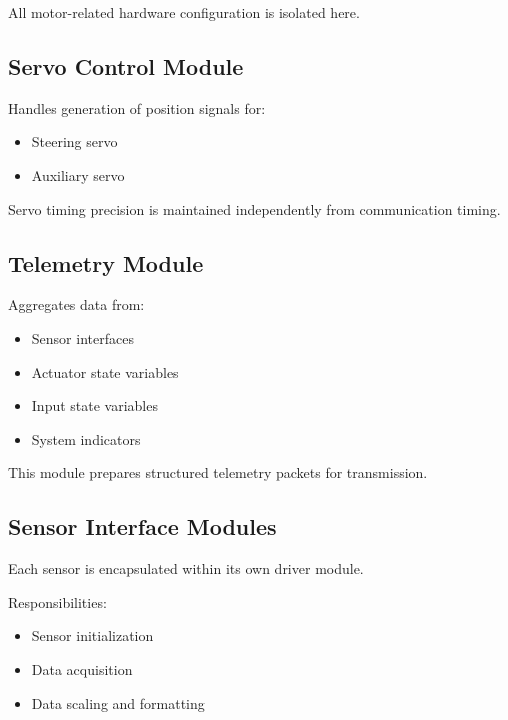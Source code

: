 All motor-related hardware configuration is isolated here.


\subsection{Servo Control Module}

Handles generation of position signals for:

\begin{itemize}
	\item Steering servo
	\item Auxiliary servo
\end{itemize}

Servo timing precision is maintained independently from communication timing.


\subsection{Telemetry Module}

Aggregates data from:

\begin{itemize}
	\item Sensor interfaces
	\item Actuator state variables
	\item Input state variables
	\item System indicators
\end{itemize}

This module prepares structured telemetry packets for transmission.


\subsection{Sensor Interface Modules}

Each sensor is encapsulated within its own driver module.

Responsibilities:

\begin{itemize}
	\item Sensor initialization
	\item Data acquisition
	\item Data scaling and formatting
\end{itemize}

